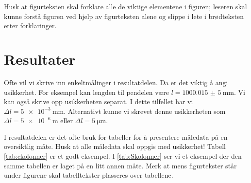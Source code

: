 Husk at figurteksten skal forklare alle de viktige elementene i figuren; leseren skal kunne forstå figuren ved hjelp av figurteksten alene og slippe i lete i brødteksten etter forklaringer. 


\section{Resultater}
Ofte vil vi skrive inn enkeltmålinger i resultatdelen. Da er det viktig å angi usikkerhet. For eksempel kan lengden til pendelen være $l=\SI{1000,015(5)}{\milli\metre}$. 
Vi kan også skrive opp usikkerheten separat. I dette tilfellet har vi $\Delta l=\SI{5e-3}{\milli\metre}$. Alternativt kunne vi skrevet denne usikkerheten som $\Delta l=\SI{5e-6}{\metre}$ eller $\Delta l=\SI{5}{\micro\metre}$.

I resultatdelen er det ofte bruk for tabeller for å presentere måledata på en oversiktlig måte. Husk at alle måledata skal oppgis med usikkerhet! Tabell \ref{tab:ckolonner} er et godt eksempel. 
I \autoref{tab:Skolonner} ser vi et eksempel der den samme tabellen er laget på en litt annen måte. Merk at mens figurtekster står under figurene skal tabelltekster plasseres over tabellene.

